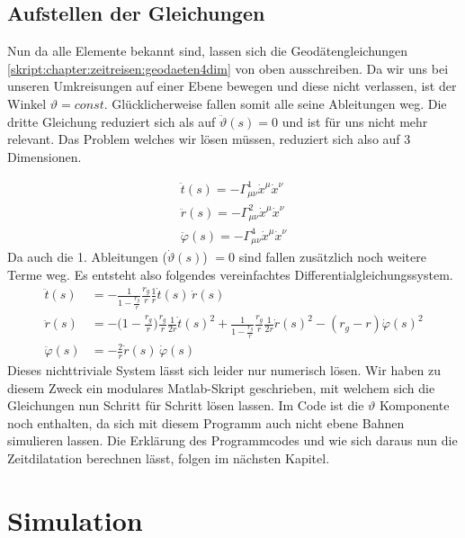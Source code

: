 \begin{refsection}
	\subsection{Aufstellen der Gleichungen}
	
	Nun da alle Elemente bekannt sind, lassen sich die Geodätengleichungen \eqref{skript:chapter:zeitreisen:geodaeten4dim} von oben ausschreiben. Da wir uns bei unseren Umkreisungen auf einer Ebene bewegen und diese nicht verlassen, ist der Winkel $\vartheta = const$. Glücklicherweise fallen somit alle seine Ableitungen weg. Die dritte Gleichung reduziert sich als auf $\ddot{\vartheta}(s)=0$ und ist für uns nicht mehr relevant. Das Problem welches wir lösen müssen, reduziert sich also auf 3 Dimensionen. 
	
	\begin{align*}
	\ddot{t}(s) = -\Gamma^{1}_{\mu\nu}\dot{x}^{\mu}\dot{x}^{\nu}\\
	\ddot{r}(s) = -\Gamma^{2}_{\mu\nu}\dot{x}^{\mu}\dot{x}^{\nu}\\
	\ddot{\varphi}(s) = -\Gamma^{4}_{\mu\nu}\dot{x}^{\mu}\dot{x}^{\nu}		
	\end{align*}
	Da auch die 1. Ableitungen ($\dot{\vartheta}(s)$) $= 0$ sind fallen zusätzlich noch weitere Terme weg. Es entsteht also folgendes vereinfachtes Differentialgleichungssystem.
	\begin{equation}
	\begin{aligned}
	\ddot t(s)
	&=
	-\frac{1}{1-\displaystyle\frac{r_g}{r}}\frac{r_g}{r}\frac{1}{r}\dot t(s)\,\dot r(s)
	\\
	\ddot r(s)
	&=
	-\biggl(1-\frac{r_g}{r}\biggr)\frac{r_g}{r}\frac1{2r}\dot t(s)^2
	+\frac{1}{1-\displaystyle\frac{r_g}{r}} \frac{r_g}{r}\frac1{2r}\dot r(s)^2
	- (r_g-r) \dot\varphi(s)^2
	\\
	\ddot \varphi(s)
	&=
	-\frac2r \dot r(s)\,\dot\varphi(s)
	\end{aligned}
	\end{equation}\label{finaleq}
	Dieses nichttriviale System lässt sich leider nur numerisch lösen. Wir haben zu diesem Zweck ein modulares Matlab-Skript geschrieben, mit welchem sich die Gleichungen nun Schritt für Schritt lösen lassen. Im Code ist die $\vartheta$ Komponente noch enthalten, da sich mit diesem Programm auch nicht ebene Bahnen simulieren lassen. Die Erklärung des Programmcodes und wie sich daraus nun die Zeitdilatation berechnen lässt, folgen im nächsten Kapitel.
		
	\section{Simulation}
		

\end{refsection}
